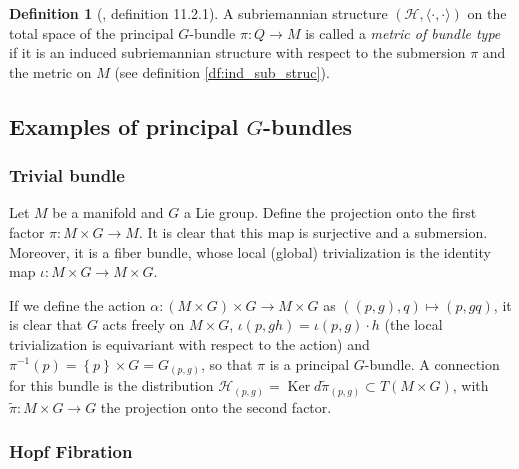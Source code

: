 \documentclass[12pt, letterpaper, reqno]{amsart}
\theoremstyle{definition}
\newtheorem{df}{Definition}
\theoremstyle{plain}
\theoremstyle{remark}
\begin{document}
\begin{df}[\cite{montgomery2002tour}, definition 11.2.1]
	A subriemannian structure $ (\mathcal{H}, \langle\cdot,\cdot\rangle) $ on the total space of the principal $ G $-bundle $ \pi: Q \rightarrow {M}
	$ is called a \textit{metric of bundle type} if it is an induced subriemannian structure with respect to the submersion $ \pi $ and the metric on $ M $  (see definition \ref{df:ind_sub_struc}).
\end{df}

\subsection{Examples of principal $ G $-bundles}%
\label{sub:examples_of_principal_g_bundles}

\subsubsection{Trivial bundle}%
\label{ssub:projection_of_cartesian_product_of_manifolds}

Let $ M$ be a manifold and $ G $ a Lie group. Define the projection onto the first factor $ \pi: M\times G \rightarrow M. $ It is clear that this map is surjective and a submersion. Moreover, it is a fiber bundle, whose local (global) trivialization is the identity map $ \iota : M\times G \rightarrow M\times G $.   

If we define the action $ \alpha: (M\times G) \times G \rightarrow M\times G $ as $ ((p, g),q)\mapsto (p,gq)  $, it is clear that $ G $ acts freely on $ M\times G $, $\iota(p, gh) = \iota(p,g)\cdot h $ (the local trivialization is equivariant with respect to the action) and $ \pi^{-1}(p) = \left\{ p \right\}\times G = G_{(p,g)} $, so that $ \pi $ is a principal $ G $-bundle. A connection for this bundle is the distribution $ \mathcal{H}_{(p,g)}= \operatorname{Ker} d\tilde{\pi}_(p,g)\subset T(M\times G) $, with $ \tilde{\pi}:M\times G \rightarrow G $ the projection onto the second factor.
\subsubsection{Hopf Fibration}%
\label{ssub:hopf_fibration}
\end{document}
